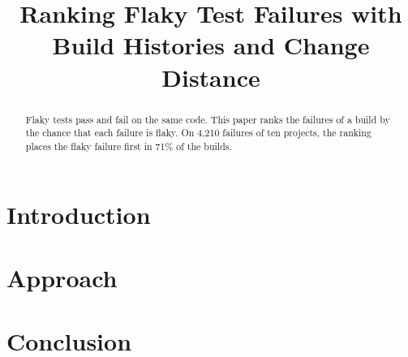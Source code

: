 \documentclass[10pt,conference,letterpaper]{IEEEtran}
\begin{document}
\title{Ranking Flaky Test Failures with\\Build Histories and Change Distance}
\author{}
\maketitle
{}

\begin{abstract}
Flaky tests pass and fail on the same code. This paper ranks the failures of a build by the
chance that each failure is flaky. On 4,210 failures of ten projects, the ranking places the
flaky failure first in 71\% of the builds.
\end{abstract}

\section{Introduction}
\lipsum[1-6]

\section{Approach}
\lipsum[7-14]

\section{Conclusion}
\lipsum[15-16]
\end{document}

